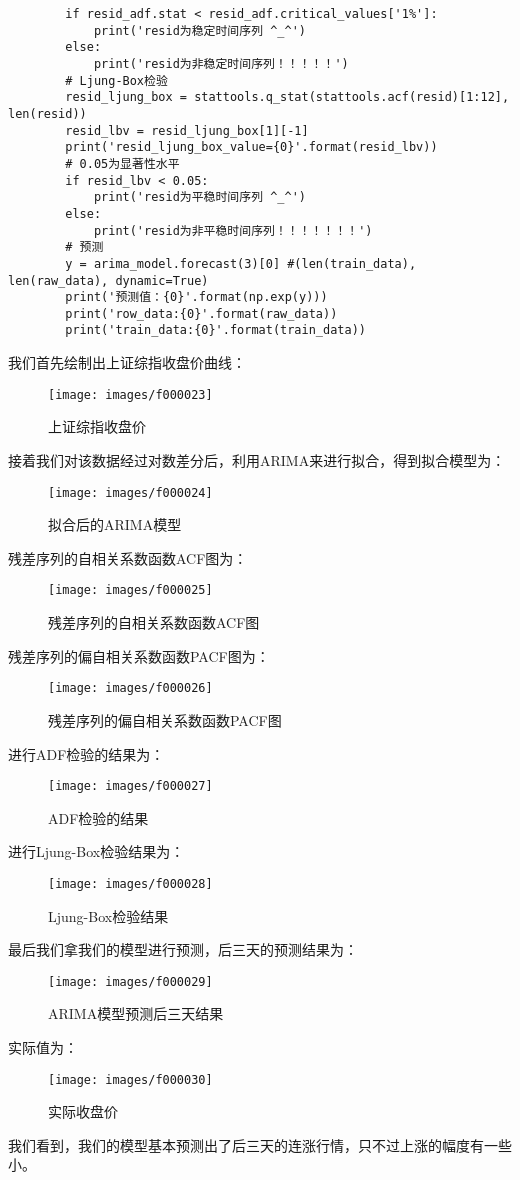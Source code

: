 \begin{lstlisting}
        if resid_adf.stat < resid_adf.critical_values['1%']:
            print('resid为稳定时间序列 ^_^')
        else:
            print('resid为非稳定时间序列！！！！！')
        # Ljung-Box检验
        resid_ljung_box = stattools.q_stat(stattools.acf(resid)[1:12], len(resid))
        resid_lbv = resid_ljung_box[1][-1]
        print('resid_ljung_box_value={0}'.format(resid_lbv))
        # 0.05为显著性水平
        if resid_lbv < 0.05:
            print('resid为平稳时间序列 ^_^')
        else:
            print('resid为非平稳时间序列！！！！！！！')
        # 预测
        y = arima_model.forecast(3)[0] #(len(train_data), len(raw_data), dynamic=True)
        print('预测值：{0}'.format(np.exp(y)))
        print('row_data:{0}'.format(raw_data))
        print('train_data:{0}'.format(train_data))
\end{lstlisting}
我们首先绘制出上证综指收盘价曲线：
\begin{figure}[H]
	\caption{上证综指收盘价}
	\label{f000023}
	\centering
	\texttt{[image: images/f000023]}
\end{figure}
接着我们对该数据经过对数差分后，利用ARIMA来进行拟合，得到拟合模型为：
\begin{figure}[H]
	\caption{拟合后的ARIMA模型}
	\label{f000024}
	\centering
	\texttt{[image: images/f000024]}
\end{figure}
残差序列的自相关系数函数ACF图为：
\begin{figure}[H]
	\caption{残差序列的自相关系数函数ACF图}
	\label{f000025}
	\centering
	\texttt{[image: images/f000025]}
\end{figure}
残差序列的偏自相关系数函数PACF图为：
\begin{figure}[H]
	\caption{残差序列的偏自相关系数函数PACF图}
	\label{f000026}
	\centering
	\texttt{[image: images/f000026]}
\end{figure}
进行ADF检验的结果为：
\begin{figure}[H]
	\caption{ADF检验的结果}
	\label{f000027}
	\centering
	\texttt{[image: images/f000027]}
\end{figure}
进行Ljung-Box检验结果为：
\begin{figure}[H]
	\caption{Ljung-Box检验结果}
	\label{f000028}
	\centering
	\texttt{[image: images/f000028]}
\end{figure}
最后我们拿我们的模型进行预测，后三天的预测结果为：
\begin{figure}[H]
	\caption{ARIMA模型预测后三天结果}
	\label{f000029}
	\centering
	\texttt{[image: images/f000029]}
\end{figure}
实际值为：
\begin{figure}[H]
	\caption{实际收盘价}
	\label{f000030}
	\centering
	\texttt{[image: images/f000030]}
\end{figure}
我们看到，我们的模型基本预测出了后三天的连涨行情，只不过上涨的幅度有一些小。